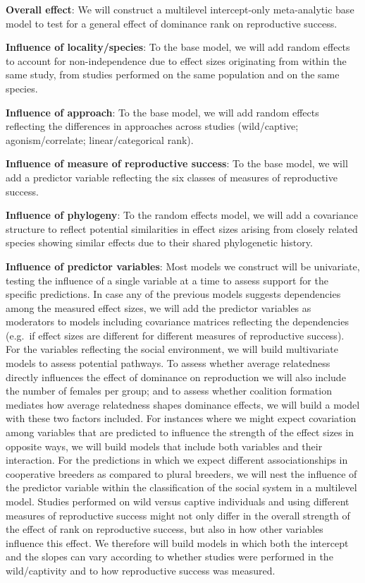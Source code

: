 \documentclass[]{article}
\begin{document}
\textbf{Overall effect}: We will construct a multilevel intercept-only
meta-analytic base model to test for a general effect of dominance rank
on reproductive success.

\textbf{Influence of locality/species}: To the base model, we will add
random effects to account for non-independence due to effect sizes
originating from within the same study, from studies performed on the
same population and on the same species.

\textbf{Influence of approach}: To the base model, we will add random
effects reflecting the differences in approaches across studies
(wild/captive; agonism/correlate; linear/categorical rank).

\textbf{Influence of measure of reproductive success}: To the base
model, we will add a predictor variable reflecting the six classes of
measures of reproductive success.

\textbf{Influence of phylogeny}: To the random effects model, we will
add a covariance structure to reflect potential similarities in effect
sizes arising from closely related species showing similar effects due
to their shared phylogenetic history.

\textbf{Influence of predictor variables}: Most models we construct will
be univariate, testing the influence of a single variable at a time to
assess support for the specific predictions. In case any of the previous
models suggests dependencies among the measured effect sizes, we will
add the predictor variables as moderators to models including covariance
matrices reflecting the dependencies (e.g.~if effect sizes are different
for different measures of reproductive success). For the variables
reflecting the social environment, we will build multivariate models to
assess potential pathways. To assess whether average relatedness
directly influences the effect of dominance on reproduction we will also
include the number of females per group; and to assess whether coalition
formation mediates how average relatedness shapes dominance effects, we
will build a model with these two factors included. For instances where
we might expect covariation among variables that are predicted to
influence the strength of the effect sizes in opposite ways, we will
build models that include both variables and their interaction. For the
predictions in which we expect different associationships in cooperative
breeders as compared to plural breeders, we will nest the influence of
the predictor variable within the classification of the social system in
a multilevel model. Studies performed on wild versus captive individuals
and using different measures of reproductive success might not only
differ in the overall strength of the effect of rank on reproductive
success, but also in how other variables influence this effect. We
therefore will build models in which both the intercept and the slopes
can vary according to whether studies were performed in the
wild/captivity and to how reproductive success was measured.
\end{document}
